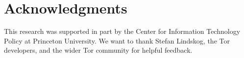 \section*{Acknowledgments}
This research was supported in part by the Center for Information Technology
Policy at Princeton University.  We want to thank Stefan Lindskog, the Tor
developers, and the wider Tor community for helpful feedback.
